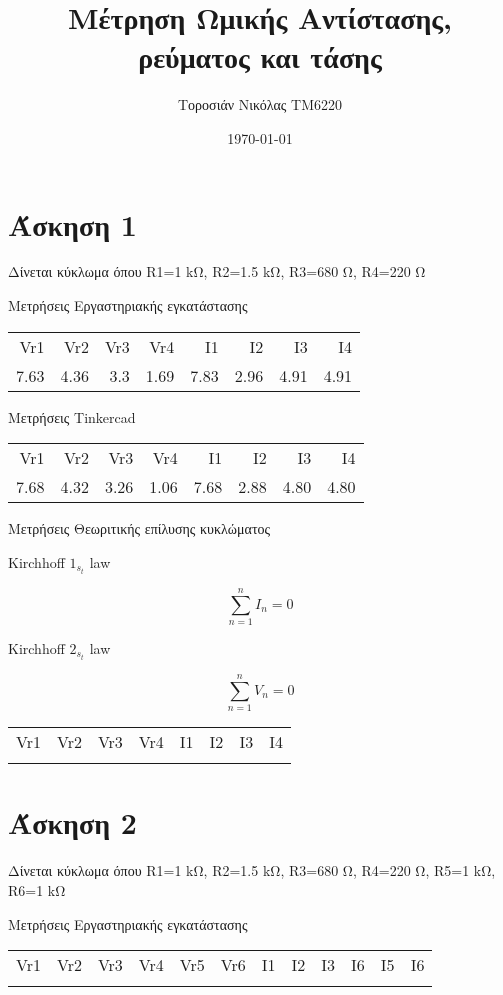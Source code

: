 \documentclass[11pt]{article}
\author{Τοροσιάν Νικόλας ΤΜ6220}
\date{\today}
\title{Μέτρηση Ωμικής Αντίστασης, ρεύματος και τάσης}
\begin{document}
\maketitle
\tableofcontents

\section{Άσκηση 1}
\label{sec:orga324e3f}
Δίνεται κύκλωμα όπου R1=1 kΩ, R2=1.5 kΩ, R3=680 Ω, R4=220 Ω

Μετρήσεις Εργαστηριακής εγκατάστασης
\begin{center}
\begin{tabular}{rrrrrrrr}
Vr1 & Vr2 & Vr3 & Vr4 & I1 & I2 & I3 & I4\\
7.63 & 4.36 & 3.3 & 1.69 & 7.83 & 2.96 & 4.91 & 4.91\\
\end{tabular}
\end{center}

Μετρήσεις Tinkercad
\begin{center}
\begin{tabular}{rrrrrrrr}
Vr1 & Vr2 & Vr3 & Vr4 & I1 & I2 & I3 & I4\\
7.68 & 4.32 & 3.26 & 1.06 & 7.68 & 2.88 & 4.80 & 4.80\\
\end{tabular}
\end{center}

Μετρήσεις Θεωριτικής επίλυσης κυκλώματος

Kirchhoff \(1_s_t\) law

\[\sum_{n=1}^{n} I_n = 0\]

Kirchhoff \(2_s_t\) law

\[\sum_{n=1}^{n} V_n = 0\]

\begin{center}
\begin{tabular}{llllllll}
Vr1 & Vr2 & Vr3 & Vr4 & I1 & I2 & I3 & I4\\
 &  &  &  &  &  &  & \\
\end{tabular}
\end{center}


\section{Άσκηση 2}
\label{sec:org6c789ed}
Δίνεται κύκλωμα όπου R1=1 kΩ, R2=1.5 kΩ, R3=680 Ω, R4=220 Ω, R5=1 kΩ, R6=1 kΩ

Μετρήσεις Εργαστηριακής εγκατάστασης
\begin{center}
\begin{tabular}{llllllllllll}
Vr1 & Vr2 & Vr3 & Vr4 & Vr5 & Vr6 & I1 & I2 & I3 & I6 & I5 & I6\\
 &  &  &  &  &  &  &  &  &  &  & \\
\end{tabular}
\end{center}
\end{document}
